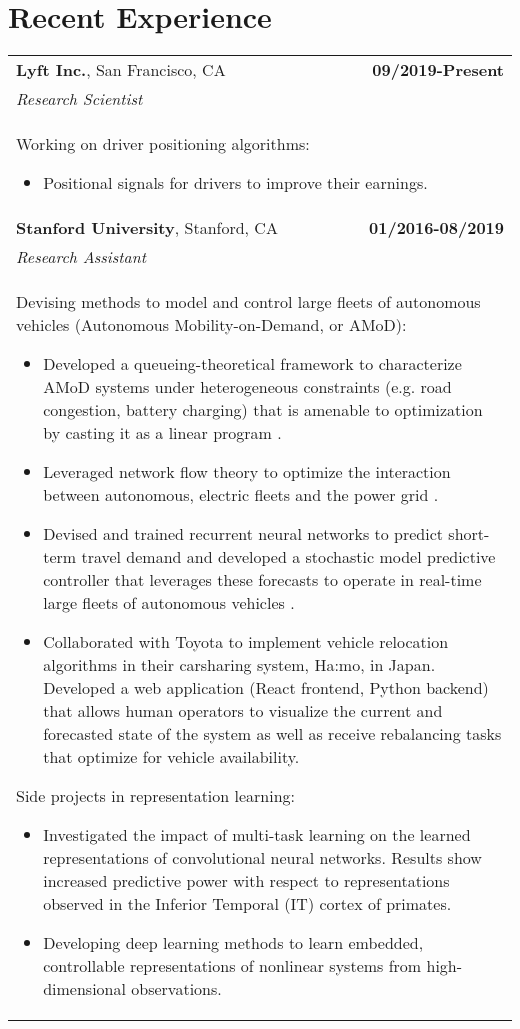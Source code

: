\documentclass[a4paper,10pt]{article}
\begin{document}
\section{Recent Experience}
\begin{tabularx}{\textwidth}{Xr}

 {\bf{Lyft Inc.}}, San Francisco, CA & \bf{09/2019-Present}\\
 \emph{Research Scientist} &\\
 \multicolumn{2}{p{0.98\textwidth}}{
 Working on driver positioning algorithms:
 \begin{itemize}
 	\item Positional signals for drivers to improve their earnings.
 \end{itemize}
 }\\

 {\bf{Stanford University}}, Stanford, CA & \bf{01/2016-08/2019}\\
 \emph{Research Assistant} &\\
 \multicolumn{2}{p{0.98\textwidth}}{
 Devising methods to model and control large fleets of autonomous vehicles (Autonomous Mobility-on-Demand, or AMoD):
 \begin{itemize}
 	\item Developed a queueing-theoretical framework to characterize AMoD systems under heterogeneous constraints (e.g. road congestion, battery charging) that is amenable to optimization by casting it as a linear program \cite{IglesiasRossiEtAl2016,IglesiasRossiEtAl2017}.
 	\item Leveraged network flow theory to optimize the interaction between autonomous, electric fleets and the power grid \cite{RossiIglesiasEtAl2018,RossiIglesiasEtAl2018b}.
 	\item Devised and trained recurrent neural networks to predict short-term travel demand and developed a stochastic model predictive controller that leverages these forecasts to operate in real-time large fleets of autonomous vehicles \cite{IglesiasRossiEtAl2018,TsaoIglesiasEtAl}.
 	\item Collaborated with Toyota to implement vehicle relocation algorithms in their carsharing system, Ha:mo, in Japan. Developed a web application (React frontend, Python backend) that allows human operators to visualize the current and forecasted state of the system as well as receive rebalancing tasks that optimize for vehicle availability.
 \end{itemize}
 Side projects in representation learning:
 \begin{itemize}
 	\item Investigated the impact of multi-task learning on the learned representations of convolutional neural networks. Results show increased predictive power with respect to representations observed in the Inferior Temporal (IT) cortex of primates.
 	\item Developing deep learning methods to learn embedded, controllable representations of nonlinear systems from high-dimensional observations. 
 \end{itemize}
 }\\


\end{tabularx}
\end{document}
